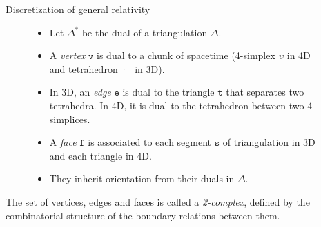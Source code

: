 \documentclass[12pt,titlepage]{article}
\begin{document}
\begin{frame}{Discretization of general relativity}
\begin{list}{\,}{\leftmargin=1em \itemindent=0em}
\begin{figure}[!ht]
\begin{minipage}{0.7\linewidth}
\begin{itemize}{\leftmargin=0em \itemindent=0em}
                    \item<3-> Let $\Delta^\text{*}$ be the dual of a triangulation $\Delta$.
                    \item<4-> A \textit{vertex} $\mathtt{v}$ is dual to a chunk of spacetime (4-simplex $\upsilon$ in 4D and tetrahedron $\uptau$ in 3D).
                    \item<5-> In 3D, an \textit{edge} $\mathtt{e}$ is dual to the triangle $\mathtt{t}$ that separates two tetrahedra. In 4D, it is dual to the tetrahedron between two 4-simplices.
                    \item<6-> A \textit{face} $\mathtt{f}$ is associated to each segment $\mathtt{s}$ of triangulation in 3D and each triangle in 4D.
                    \item<7-> They inherit orientation from their duals in $\Delta$.
                \end{itemize}
            \end{minipage}
        \end{figure}\FloatBarrier
        \item<8-> The set of vertices, edges and faces is called a \textit{2-complex}, defined by the combinatorial structure of the boundary relations between them.
    \end{list}
\end{frame}
\end{document}
